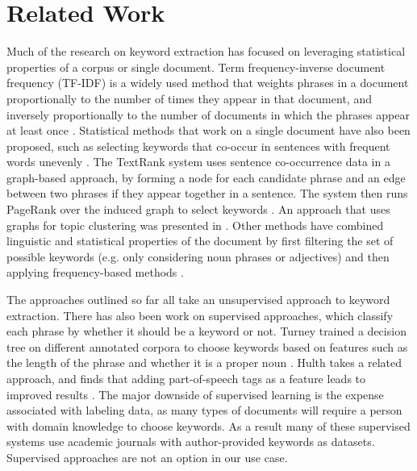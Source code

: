 \section{Related Work}
\label{sec:relWork}

Much of the research on keyword extraction has focused on leveraging
statistical properties of a corpus or single document. Term
frequency-inverse document frequency (TF-IDF) is a widely used method
that weights phrases in a document proportionally to the number of
times they appear in that document, and inversely proportionally to
the number of documents in which the phrases appear at least once
\cite{mann2008}. Statistical methods that work on a single document
have also been proposed, such as selecting keywords that co-occur in
sentences with frequent words unevenly \cite{matsuo2004keyword}. The
TextRank system uses sentence co-occurrence data in a graph-based
approach, by forming a node for each candidate phrase and an edge
between two phrases if they appear together in a sentence. The system
then runs PageRank over the induced graph to select keywords
\cite{mihalcea2004textrank}. An approach that uses graphs for topic
clustering was presented in \cite{ohsawa1998}.  Other methods have
combined linguistic and statistical properties of the document by
first filtering the set of possible keywords (e.g. only considering
noun phrases or adjectives) and then applying frequency-based methods
\cite{rose2010automatic}.

The approaches outlined so far all take an unsupervised approach to
keyword extraction. There has also been work on supervised approaches,
which classify each phrase by whether it should be a keyword or
not. Turney trained a decision tree on different annotated corpora to
choose keywords based on features such as the length of the phrase and
whether it is a proper noun \cite{turney1999learning}. Hulth takes a
related approach, and finds that adding part-of-speech tags as a
feature leads to improved results \cite{hulth2003improved}. The major
downside of supervised learning is the expense associated with
labeling data, as many types of documents will require a person with
domain knowledge to choose keywords. As a result many of these
supervised systems use academic journals with author-provided keywords
as datasets. Supervised approaches are not an option in our use case.

